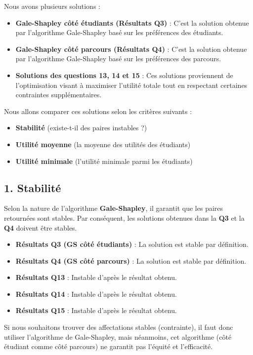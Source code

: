 \documentclass[a4paper,11pt]{article}
\begin{document}
Nous avons plusieurs solutions :
\begin{itemize}
    \item \textbf{Gale-Shapley côté étudiants (Résultats Q3)} : C'est la solution obtenue par l'algorithme Gale-Shapley basé sur les préférences des étudiants.
    \item \textbf{Gale-Shapley côté parcours (Résultats Q4)} : C'est la solution obtenue par l'algorithme Gale-Shapley basé sur les préférences des parcours.
    \item \textbf{Solutions des questions 13, 14 et 15} : Ces solutions proviennent de l'optimisation visant à maximiser l'utilité totale tout en respectant certaines contraintes supplémentaires.
\end{itemize}

Nous allons comparer ces solutions selon les critères suivants :
\begin{itemize}
    \item \textbf{Stabilité} (existe-t-il des paires instables ?)
    \item \textbf{Utilité moyenne} (la moyenne des utilités des étudiants)
    \item \textbf{Utilité minimale} (l'utilité minimale parmi les étudiants)
\end{itemize}

\subsection*{1. Stabilité}

Selon la nature de l'algorithme \textbf{Gale-Shapley}, il garantit que les paires retournées sont stables. Par conséquent, les solutions obtenues dans la \textbf{Q3} et la \textbf{Q4} doivent être stables.

\begin{itemize}
    \item \textbf{Résultats Q3 (GS côté étudiants)} : La solution est stable par définition.
    \item \textbf{Résultats Q4 (GS côté parcours)} : La solution est stable par définition.
    \item \textbf{Résultats Q13} : Instable d'après le résultat obtenu.
    \item \textbf{Résultats Q14} : Instable d'après le résultat obtenu.
    \item \textbf{Résultats Q15} : Instable d'après le résultat obtenu.
\end{itemize}

Si nous souhaitons trouver des affectations stables (contrainte), il faut donc utiliser l'algorithme de Gale-Shapley, mais néanmoins, cet algorithme (côté étudiant comme côté parcours) ne garantit pas l'équité et l'efficacité.
\end{document}
